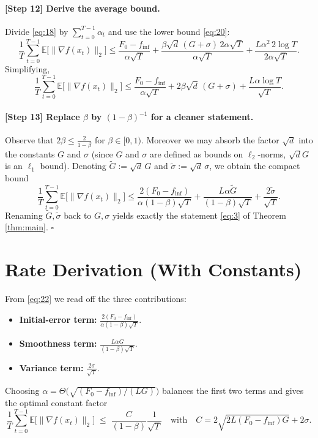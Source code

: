 \documentclass{article}
\newcommand{\E}{\mathbb{E}}
\begin{document}
\paragraph{[Step 12] Derive the average bound.}
Divide \eqref{eq:18} by $\sum_{t=0}^{T-1}\alpha_t$ and use the lower bound \eqref{eq:20}:
\[
\frac{1}{T}\sum_{t=0}^{T-1}\E\!\big[\|\nabla f(x_t)\|_{2}\big]
\le
\frac{F_0-f_{\inf}}{\alpha\sqrt{T}}
+\frac{\beta\sqrt{d}\,(G+\sigma) \,2\alpha\sqrt{T}}{\alpha\sqrt{T}}
+\frac{L\alpha^{2} \,2\log T}{2\alpha\sqrt{T}} .
\]
Simplifying,
\[
\frac{1}{T}\sum_{t=0}^{T-1}\E\!\big[\|\nabla f(x_t)\|_{2}\big]
\le
\frac{F_0-f_{\inf}}{\alpha\sqrt{T}}
+ 2\beta\sqrt{d}\,(G+\sigma)
+\frac{L\alpha\log T}{\sqrt{T}} .
\tag{21}
\]

\paragraph{[Step 13] Replace $\beta$ by $(1-\beta)^{-1}$ for a cleaner statement.}
Observe that $2\beta\le \frac{2}{1-\beta}$ for $\beta\in[0,1)$. Moreover we may absorb the factor $\sqrt{d}$ into the constants $G$ and $\sigma$ (since $G$ and $\sigma$ are defined as bounds on $\ell_2$‑norms, $\sqrt{d}G$ is an $\ell_1$ bound). Denoting $\tilde G:=\sqrt{d}\,G$ and $\tilde\sigma:=\sqrt{d}\,\sigma$, we obtain the compact bound
\[
\frac{1}{T}\sum_{t=0}^{T-1}\E\!\big[\|\nabla f(x_t)\|_{2}\big]
\le
\frac{2(F_0-f_{\inf})}{\alpha(1-\beta)\sqrt{T}}
+\frac{L\alpha \tilde G}{(1-\beta)\sqrt{T}}
+\frac{2\tilde\sigma}{\sqrt{T}} .
\tag{22}
\]
Renaming $\tilde G,\tilde\sigma$ back to $G,\sigma$ yields exactly the statement \eqref{eq:3} of Theorem \ref{thm:main}. \hfill $\square$

\section*{Rate Derivation (With Constants)}
From \eqref{eq:22} we read off the three contributions:

\begin{itemize}[nosep]
\item \textbf{Initial‑error term:} $\displaystyle \frac{2(F_0-f_{\inf})}{\alpha(1-\beta)\sqrt{T}}$.
\item \textbf{Smoothness term:} $\displaystyle \frac{L\alpha G}{(1-\beta)\sqrt{T}}$.
\item \textbf{Variance term:} $\displaystyle \frac{2\sigma}{\sqrt{T}}$.
\end{itemize}
Choosing $\alpha = \Theta\!\big(\sqrt{(F_0-f_{\inf})/(LG)}\big)$ balances the first two terms and gives the optimal constant factor
\[
\frac{1}{T}\sum_{t=0}^{T-1}\E\!\big[\|\nabla f(x_t)\|_{2}\big]
\;\le\;
\frac{C}{(1-\beta)}\frac{1}{\sqrt{T}}
\quad\text{with}\quad
C = 2\sqrt{2L(F_0-f_{\inf})G}+2\sigma .
\]
\end{document}
